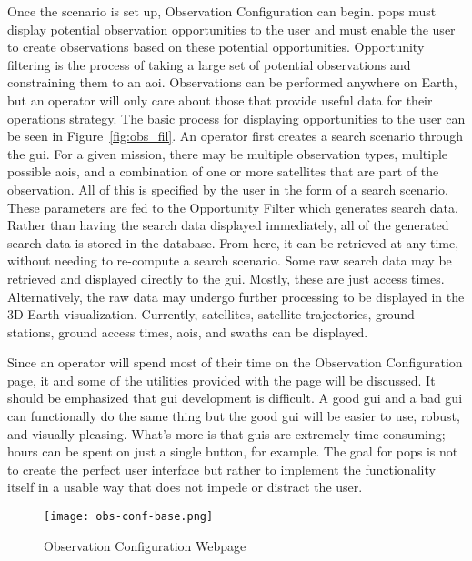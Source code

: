Once the scenario is set up, Observation Configuration can begin. \gls{pops}
must display potential observation opportunities to the user and must enable
the user to create observations based on these potential opportunities.
Opportunity filtering is the process of taking a large set of potential
observations and constraining them to an \gls{aoi}. Observations can be
performed anywhere on Earth, but an operator will only care about those that
provide useful data for their operations strategy.  The basic process for
displaying opportunities to the user can be seen in Figure~\ref{fig:obs_fil}.
An operator first creates a search scenario through the \gls{gui}.  For a given
mission, there may be multiple observation types, multiple possible
\glspl{aoi}, and a combination of one or more satellites that are part of the
observation. All of this is specified by the user in the form of a search
scenario. These parameters are fed to the Opportunity Filter which generates
search data.  Rather than having the search data displayed immediately, all of
the generated search data is stored in the database. From here, it can be
retrieved at any time, without needing to re-compute a search scenario. Some
raw search data may be retrieved and displayed directly to the \gls{gui}.
Mostly, these are just access times.  Alternatively, the raw data may undergo
further processing to be displayed in the 3D Earth visualization. Currently,
satellites, satellite trajectories, ground stations, ground access times,
\glspl{aoi}, and swaths can be displayed.


Since an operator will spend most of their time on the Observation
Configuration page, it and some of the utilities provided with the page will be
discussed.  It should be emphasized that \gls{gui}  development is difficult.
A good \gls{gui} and a bad \gls{gui} can functionally do the same thing but the
good \gls{gui} will be easier to use, robust, and visually pleasing. What's
more is that \glspl{gui} are extremely time-consuming; hours can be spent on
just a single button, for example. The goal for \gls{pops} is not to create the
perfect user interface but rather to implement the functionality itself in a
usable way that does not impede or distract the user.

\begin{figure}
    \centering
    \texttt{[image: obs-conf-base.png]} 
    \caption{Observation Configuration Webpage}
    \label{fig:obs-conf-base} 
\end{figure}


